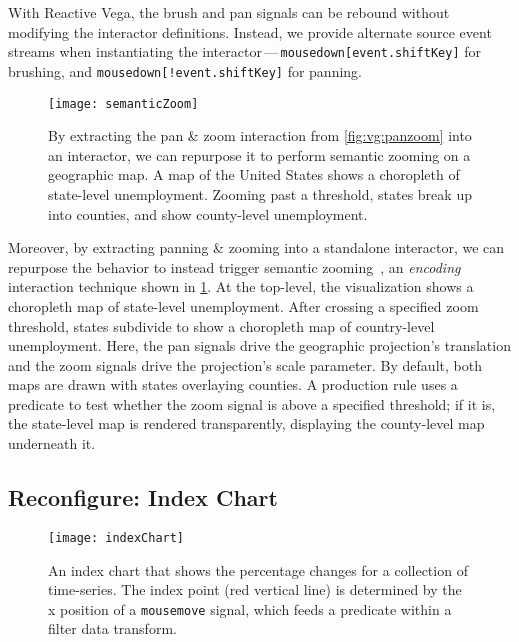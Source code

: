 With Reactive Vega, the brush and pan signals can be rebound without modifying
the interactor definitions. Instead, we provide alternate source event streams
when instantiating the interactor\,---\,\texttt{mousedown[event.shiftKey]} for
brushing, and \texttt{mousedown[!event.shiftKey]} for panning.

\begin{figure}[h!]
  \centering
  \texttt{[image: semanticZoom]}
  \caption{By extracting the pan \& zoom interaction from \cref{fig:vg:panzoom}
  into an interactor, we can repurpose it to perform semantic zooming on a
  geographic map. A map of the United States shows a choropleth of state-level
  unemployment. Zooming past a threshold, states break up into counties, and
  show county-level unemployment.}
  \label{fig:vg:semanticZoom}
\end{figure}

Moreover, by extracting panning \& zooming into a standalone interactor, we can
repurpose the behavior to instead trigger semantic zooming~\cite{perlin:pad}, an
\emph{encoding} interaction technique shown in \cref{fig:vg:semanticZoom}. At
the top-level, the visualization shows a choropleth map of state-level
unemployment. After crossing a specified zoom threshold, states subdivide to
show a choropleth map of country-level unemployment. Here, the pan signals drive
the geographic projection's translation and the zoom signals drive the
projection's scale parameter. By default, both maps are drawn with states
overlaying counties. A production rule uses a predicate to test whether the zoom
signal is above a specified threshold; if it is, the state-level map is rendered
transparently, displaying the county-level map underneath it.

\subsection{Reconfigure: Index Chart}

\begin{figure}[h!]
  \centering
  \texttt{[image: indexChart]}
  \caption{An index chart that shows the percentage changes for a collection of
  time-series. The index point (red vertical line) is determined by the x
  position of a \texttt{mousemove} signal, which feeds a predicate within a
  filter data transform.}
  \label{fig:vg:indexChart}
\end{figure}

